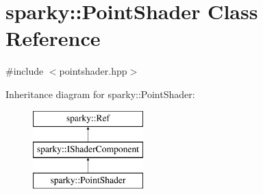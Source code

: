 \hypertarget{classsparky_1_1_point_shader}{}\section{sparky\+:\+:Point\+Shader Class Reference}
\label{classsparky_1_1_point_shader}


{\ttfamily \#include $<$pointshader.\+hpp$>$}

Inheritance diagram for sparky\+:\+:Point\+Shader\+:\begin{figure}[H]
\begin{center}
\leavevmode
\includegraphics[height=3.000000cm]{classsparky_1_1_point_shader}
\end{center}
\end{figure}
